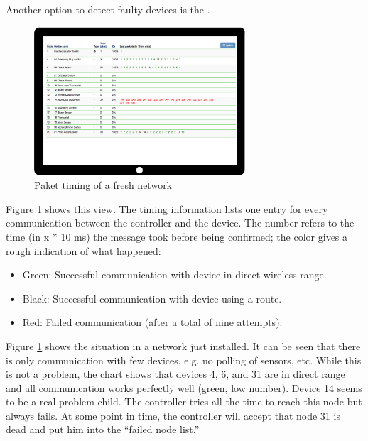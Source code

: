 Another option to detect faulty devices is the . 

\begin{figure}
\begin{center}
\includegraphics[width=0.7\textwidth]{pngs/cap8/c5timinginfo1.png}
\caption{Paket timing of a fresh \zwave network}
\label{c5:snifferfresh}
\end{center}
\end{figure}

Figure \ref{c5:snifferfresh} shows this view. The timing information lists one entry for 
every communication between the controller and the device. The number refers to the time 
(in x * 10 ms) the message took before being confirmed; the color gives a rough 
indication of what happened:

\begin{itemize}
\item Green: Successful communication with device in direct wireless range.
\item Black: Successful communication with device using a route.
\item Red: Failed communication (after a total of nine attempts).
\end{itemize}

Figure \ref{c5:snifferfresh} shows the situation in a network just installed. It can be 
seen that there is only communication with few devices, e.g. no polling of sensors, etc. 
While this is not a problem, the chart shows that devices 4, 6, and 31 are in direct 
range and all communication works perfectly well (green, low number). Device 14 seems 
to be a real problem child. The controller tries all the time to reach this node but 
always fails. At some point in time, the controller will accept that node 31 is dead 
and put him into the ``failed node list.''

